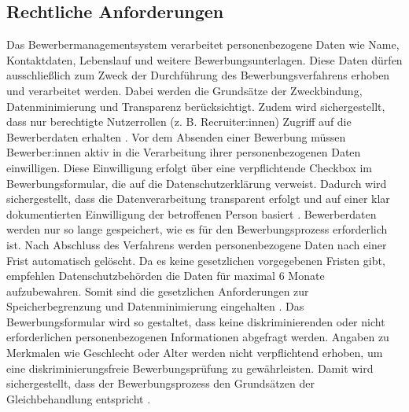 \subsection{Rechtliche Anforderungen}
Das Bewerbermanagementsystem verarbeitet personenbezogene Daten wie Name, Kontaktdaten, Lebenslauf und weitere Bewerbungsunterlagen. 
Diese Daten dürfen ausschließlich zum Zweck der Durchführung des Bewerbungsverfahrens erhoben und verarbeitet werden.
Dabei werden die Grundsätze der Zweckbindung, Datenminimierung und Transparenz berücksichtigt. 
Zudem wird sichergestellt, dass nur berechtigte Nutzerrollen (z. B. Recruiter:innen) Zugriff auf die Bewerberdaten erhalten \parencite[vgl.][Art.~5--6]{dsgvo}.
\newline
Vor dem Absenden einer Bewerbung müssen Bewerber:innen aktiv in die Verarbeitung ihrer personenbezogenen Daten einwilligen. 
Diese Einwilligung erfolgt über eine verpflichtende Checkbox im Bewerbungsformular, die auf die Datenschutzerklärung verweist. 
Dadurch wird sichergestellt, dass die Datenverarbeitung transparent erfolgt und auf einer klar dokumentierten Einwilligung der betroffenen Person basiert \parencite[vgl.][Art.~6 Abs. 1 lit.~a und 7]{dsgvo}.
\newline
Bewerberdaten werden nur so lange gespeichert, wie es für den Bewerbungsprozess erforderlich ist. 
Nach Abschluss des Verfahrens werden personenbezogene Daten nach einer Frist automatisch gelöscht. 
Da es keine gesetzlichen vorgegebenen Fristen gibt, empfehlen Datenschutzbehörden die Daten für maximal 6 Monate aufzubewahren.
Somit sind die gesetzlichen Anforderungen zur Speicherbegrenzung und Datenminimierung eingehalten \parencite[vgl.][Art.~5 Abs. 1 lit.]{dsgvo}.
\newline
Das Bewerbungsformular wird so gestaltet, dass keine diskriminierenden oder nicht erforderlichen personenbezogenen Informationen abgefragt werden. 
Angaben zu Merkmalen wie Geschlecht oder Alter werden nicht verpflichtend erhoben, um eine diskriminierungsfreie Bewerbungsprüfung zu gewährleisten. 
Damit wird sichergestellt, dass der Bewerbungsprozess den Grundsätzen der Gleichbehandlung entspricht \parencite[vgl.][§1 und §7]{agg}.
